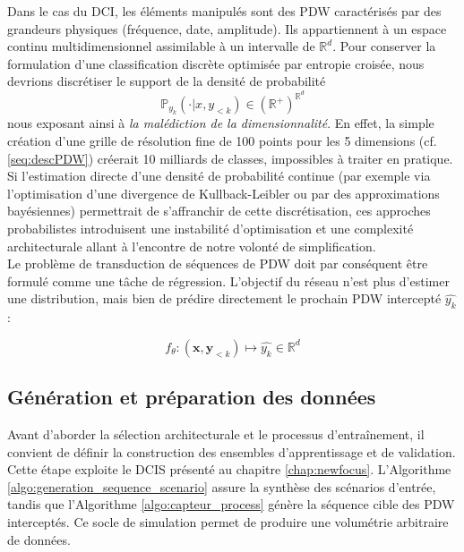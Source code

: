Dans le cas du DCI, les éléments manipulés sont des PDW caractérisés par des grandeurs physiques (fréquence, date, amplitude). Ils appartiennent à un espace continu multidimensionnel assimilable à un intervalle de $\mathbb{R}^d$. Pour conserver la formulation d'une classification discrète optimisée par entropie croisée, nous devrions discrétiser le support de la densité de probabilité
$$\mathbb{P}_{y_k}(\cdot \vert{} x, y_{<k}) \in \mathbb{(R^+)}^{\mathbb{R}^d}$$
nous exposant ainsi à \textit{la malédiction de la dimensionnalité}. En effet, la simple création d'une grille de résolution fine de 100 points pour les 5 dimensions (cf. \ref{seq:descPDW}) créerait 10 milliards de classes, impossibles à traiter en pratique. Si l'estimation directe d'une densité de probabilité continue (par exemple via l'optimisation d'une divergence de Kullback-Leibler ou par des approximations bayésiennes) permettrait de s'affranchir de cette discrétisation, ces approches probabilistes introduisent une instabilité d'optimisation et une complexité architecturale allant à l'encontre de notre volonté de simplification.\\


Le problème de transduction de séquences de PDW doit par conséquent être formulé comme une tâche de régression. L'objectif du réseau n'est plus d'estimer une distribution, mais bien de prédire directement le prochain PDW intercepté $\hat{y_k}$ :

\begin{equation}
\label{eq:trad_dci}
f_{\theta}:(\mathbf{x},\mathbf{y}_{<k})\mapsto \hat{y_k} \in \mathbb{R}^d    
\end{equation}

\subsection{Génération et préparation des données}
Avant d'aborder la sélection architecturale et le processus d'entraînement, il convient de définir la construction des ensembles d'apprentissage et de validation. Cette étape exploite le DCIS présenté au chapitre \ref{chap:newfocus}. L'Algorithme \ref{algo:generation_sequence_scenario} assure la synthèse des scénarios d'entrée, tandis que l'Algorithme \ref{algo:capteur_process} génère la séquence cible des PDW interceptés. Ce socle de simulation permet de produire une volumétrie arbitraire de données.

